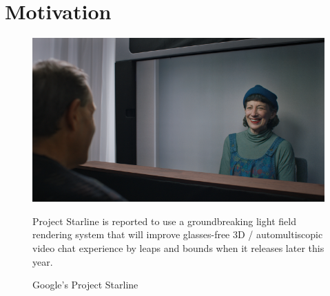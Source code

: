 \section{Motivation}\label{sec:motivation} 

\begin{figure}[!h]
    \includegraphics[width=1\columnwidth]{figures/google-starline-416.png}
    \caption{Google's Project Starline}
    \label{fig:google-starline}
    {\small Project Starline is reported to use a groundbreaking light field rendering system that will improve glasses-free 3D / automultiscopic video chat experience by leaps and bounds when it releases later this year.}
\end{figure}

